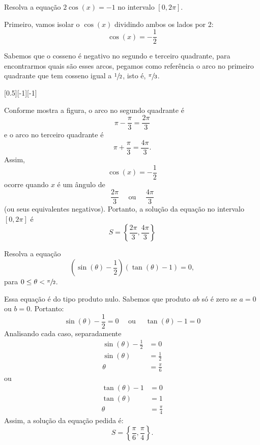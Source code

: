 \begin{example}
  Resolva a equação $2\cos(x)= -1$ no intervalo $[0,2\pi]$.

  \solution
  Primeiro, vamos isolar o $\cos(x)$ dividindo ambos os lados por 2:
  \[
    \cos(x)= -\frac{1}{2}
  \]

  Sabemos que o cosseno é negativo no segundo e terceiro quadrante, para
  encontrarmos quais são esses arcos, pegamos como referência o arco no
  primeiro quadrante que tem cosseno igual a
  $\sfrac{1}{2}$, isto é,
  $\sfrac{\pi}{3}$.

  [0.5][-1][-1]

  Conforme mostra a figura, o arco no segundo quadrante é
  \[
    \pi-\frac{\pi}{3}= \frac{2\pi}{3}
  \]
  e o arco no terceiro quadrante é
  \[
    \pi+\frac{\pi}{3}= \frac{4\pi}{3}.
  \]
  Assim,
  \[
    \cos(x) = -\frac{1}{2}
  \]
  ocorre quando $x$ é um ângulo de
  \[
    \frac{2\pi}{3}
    \quad\text{ ou }\quad
    \frac{4\pi}{3}
  \]
  (ou seus equivalentes negativos).
  Portanto, a solução da equação no intervalo $[0, 2\pi]$ é
  \[
    S= \left\{\frac{2\pi}{3}, \frac{4\pi}{3} \right\}
  \]
\end{example}

\begin{example}
  Resolva a equação
  \[
    \left(\sin(\theta) -\frac{1}{2} \right)
    \left(\tan(\theta) -1 \right) = 0,
  \]
  para $0 \leq \theta < \sfrac{\pi}{2}$.

  \solution
  Essa equação é do tipo produto nulo. Sabemos que produto $ab$ só é zero se
  $a = 0$ ou $ b = 0$.
  Portanto:
  \[
    \sin(\theta) -\frac{1}{2} = 0
    \quad\text{ ou }\quad
    \tan(\theta) -1 = 0
  \]
  Analisando cada caso, separadamente
  \begin{align*}
    \sin(\theta) -\frac{1}{2} & =0              \\
    \sin(\theta)              & =\frac{1}{2}    \\
    \theta                    & = \frac{\pi}{6}
  \end{align*}
  ou
  \begin{align*}
    \tan(\theta) -1 & = 0            \\
    \tan(\theta)    & = 1            \\
    \theta          & =\frac{\pi}{4}
  \end{align*}
  Assim, a solução da equação pedida é:
  \[
    S = \left\{ \frac{\pi}{6}, \frac{\pi}{4} \right\}.
  \]
\end{example}

